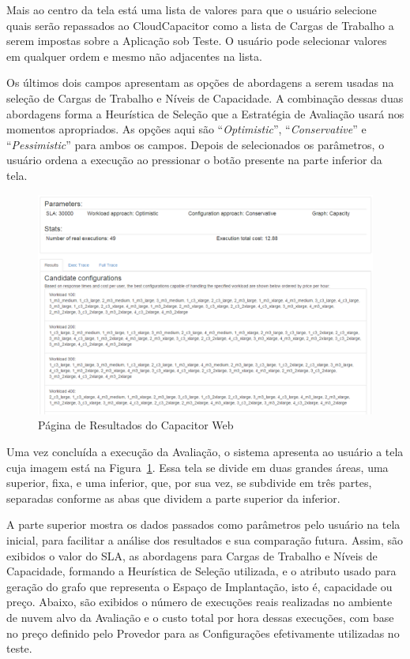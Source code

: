 Mais ao centro da tela está uma lista de valores para que o usuário selecione quais 
serão repassados ao CloudCapacitor como a lista de Cargas de Trabalho a serem impostas
sobre a Aplicação sob Teste. O usuário pode selecionar valores em qualquer ordem e mesmo
não adjacentes na lista.

Os últimos dois campos apresentam as opções de abordagens a serem usadas na seleção de
Cargas de Trabalho e Níveis de Capacidade. A combinação dessas duas abordagens forma a
Heurística de Seleção que a Estratégia de Avaliação usará nos momentos apropriados. As 
opções aqui são ``\emph{Optimistic}'', ``\emph{Conservative}'' e ``\emph{Pessimistic}''
para ambos os campos. Depois de selecionados os parâmetros, o usuário ordena a execução 
ao pressionar o botão presente na parte inferior da tela.

\begin{figure}[htb]
  \caption{\label{fig:capacitor_web_results}Página de Resultados do Capacitor Web}
  \begin{center}
    \includegraphics[scale=0.5]{img/CapacitorWeb_Results}
  \end{center}
\end{figure}

Uma vez concluída a execução da Avaliação, o sistema apresenta ao usuário a tela
cuja imagem está na Figura~\ref{fig:capacitor_web_results}. Essa tela se divide
em duas grandes áreas, uma superior, fixa, e uma inferior, que, por sua vez, 
se subdivide em três partes, separadas conforme as abas que dividem a parte 
superior da inferior.

A parte superior mostra os dados passados como parâmetros pelo usuário na tela
inicial, para facilitar a análise dos resultados e sua comparação futura. Assim,
são exibidos o valor do SLA, as abordagens para Cargas de Trabalho e Níveis de 
Capacidade, formando a Heurística de Seleção utilizada, e o atributo usado para
geração do grafo que representa o Espaço de Implantação, isto é, capacidade ou
preço. Abaixo, são exibidos o número de execuções reais realizadas no ambiente
de nuvem alvo da Avaliação e o custo total por hora dessas execuções, com base
no preço definido pelo Provedor para as Configurações efetivamente utilizadas no 
teste. 
 

